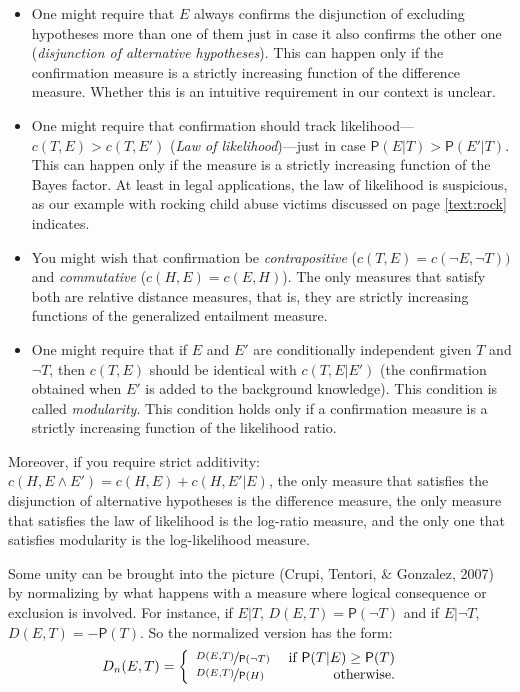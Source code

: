 \documentclass[
  10pt,
  dvipsnames,enabledeprecatedfontcommands]{scrartcl}
\newcommand{\n}{\neg}
\newcommand{\et}{\wedge}
\newcommand{\pr}[1]{\mathsf{P}(#1)}
\begin{document}
\begin{itemize}
\item
  One might require that \(E\) always confirms the disjunction of
  excluding hypotheses more than one of them just in case it also
  confirms the other one (\emph{disjunction of alternative hypotheses}).
  This can happen only if the confirmation measure is a strictly
  increasing function of the difference measure. Whether this is an
  intuitive requirement in our context is unclear.
\item
  One might require that confirmation should track
  likelihood---\(c(T,E) > c(T,E')\) (\emph{Law of likelihood})---just in
  case \(\pr{E\vert T} > \pr{E'\vert T}\). This can happen only if the
  measure is a strictly increasing function of the Bayes factor. At
  least in legal applications, the law of likelihood is suspicious, as
  our example with rocking child abuse victims discussed on page
  \ref{text:rock} indicates.
\item
  You might wish that confirmation be \emph{contrapositive}
  (\(c(T,E) = c(\n E, \n T))\) and \emph{commutative}
  (\(c(H,E) = c(E,H)\)). The only measures that satisfy both are
  relative distance measures, that is, they are strictly increasing
  functions of the generalized entailment measure.
\item
  One might require that if \(E\) and \(E'\) are conditionally
  independent given \(T\) and \(\neg T\), then \(c(T,E)\) should be
  identical with \(c(T,E\vert E')\) (the confirmation obtained when
  \(E'\) is added to the background knowledge). This condition is called
  \emph{modularity}. This condition holds only if a confirmation measure
  is a strictly increasing function of the likelihood ratio.
\end{itemize}

Moreover, if you require strict additivity:
\(c(H, E\et E') = c(H, E) + c(H, E'\vert E)\), the only measure that
satisfies the disjunction of alternative hypotheses is the difference
measure, the only measure that satisfies the law of likelihood is the
log-ratio measure, and the only one that satisfies modularity is the
log-likelihood measure.

Some unity can be brought into the picture (Crupi, Tentori, \& Gonzalez,
2007) by normalizing by what happens with a measure where logical
consequence or exclusion is involved. For instance, if \(E \vert T\),
\(D(E,T)=\pr{\n T}\) and if \(E\vert \n T\), \(D(E,T) = - \pr{T}\). So
the normalized version has the form: \begin{align*}
D_n(E,T)  & = \left\{ \begin{array}{lr}
\nicefrac{D(E,T)}{\pr{\n T}} & \mbox{ if } \pr{T\vert E} \geq \pr{T}\\
\nicefrac{D(E,T)}{\pr{H}} &\mbox { otherwise.}\\
\end{array} \right.
\end{align*}
\end{document}
